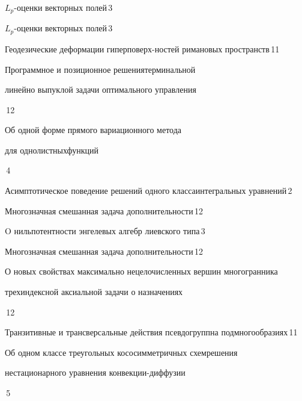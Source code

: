 

{$L_p$-оценки векторных полей}{\No\,3}




{$L_p$-оценки векторных полей}{\No\,3}




{Геодезические деформации гиперповерх-\newline ностей римановых пространств}{\No\,11}




{Программное и позиционное решения\newline терминальной


линейно выпуклой задачи оптимального управления}{\No\,12}




{Об одной форме прямого вариационного метода


для однолистных\newline функций}{\No\,4}




{Асимптотическое поведение решений одного класса\newline интегральных уравнений}{\No\,2}




{Многозначная смешанная задача дополнительности}{\No\,12}




{O нильпотентности энгелевых алгебр лиевского типа}{\No\,3}




{Многозначная смешанная задача дополнительности}{\No\,12}




{О новых свойствах максимально нецелочисленных вершин многогранника \newline


трехиндексной аксиальной задачи о назначениях}{\No\,12}




{Транзитивные и  трансверсальные действия псевдогрупп\newline на подмногообразиях}{\No\,11}




{Об одном классе треугольных кососимметричных схем\newline решения


нестационарного уравнения конвекции-диффузии}{\No\,5}


